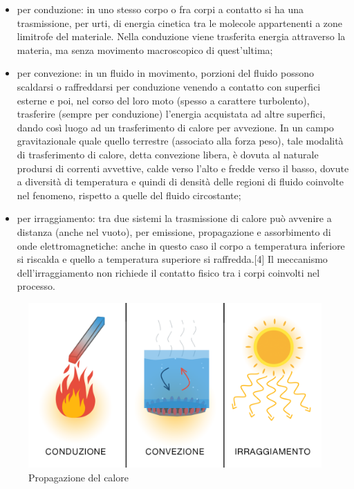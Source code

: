 \documentclass[a4paper]{report}
\begin{document}
    \begin{itemize}
        \item per conduzione: in uno stesso corpo o fra corpi a contatto si ha una trasmissione, per urti, di energia cinetica tra le molecole appartenenti a zone limitrofe del materiale. Nella conduzione viene trasferita energia attraverso la materia, ma senza movimento macroscopico di quest'ultima;
        
        \item per convezione: in un fluido in movimento, porzioni del fluido possono scaldarsi o raffreddarsi per conduzione venendo a contatto con superfici esterne e poi, nel corso del loro moto (spesso a carattere turbolento), trasferire (sempre per conduzione) l'energia acquistata ad altre superfici, dando così luogo ad un trasferimento di calore per avvezione. In un campo gravitazionale quale quello terrestre (associato alla forza peso), tale modalità di trasferimento di calore, detta convezione libera, è dovuta al naturale prodursi di correnti avvettive, calde verso l'alto e fredde verso il basso, dovute a diversità di temperatura e quindi di densità delle regioni di fluido coinvolte nel fenomeno, rispetto a quelle del fluido circostante;
        
        \item per irraggiamento: tra due sistemi la trasmissione di calore può avvenire a distanza (anche nel vuoto), per emissione, propagazione e assorbimento di onde elettromagnetiche: anche in questo caso il corpo a temperatura inferiore si riscalda e quello a temperatura superiore si raffredda.[4] Il meccanismo dell'irraggiamento non richiede il contatto fisico tra i corpi coinvolti nel processo.
    \end{itemize}
    
    \begin{figure}
        \centering
        \includegraphics[scale=0.4]{calore}
        \caption{Propagazione del calore}
    \end{figure}
    
\end{document}
